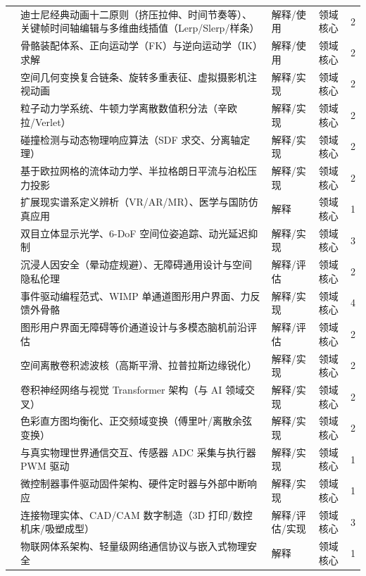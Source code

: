 \begin{tabularx}{\textwidth}{p{} Y p{0.12\textwidth} p{0.10\textwidth} p{0.08\textwidth}}
& 迪士尼经典动画十二原则（挤压拉伸、时间节奏等）、关键帧时间轴编辑与多维曲线插值（Lerp/Slerp/样条） & 解释/使用 & 领域核心 & 2 \\
& 骨骼装配体系、正向运动学（FK）与逆向运动学（IK）求解 & 解释/使用 & 领域核心 & 2 \\
& 空间几何变换复合链条、旋转多重表征、虚拟摄影机注视动画 & 解释/实现 & 领域核心 & 2 \\
\midrule
{} 
& 粒子动力学系统、牛顿力学离散数值积分法（辛欧拉/Verlet） & 解释/实现 & 领域核心 & 2 \\
& 碰撞检测与动态物理响应算法（SDF 求交、分离轴定理） & 解释/实现 & 领域核心 & 2 \\
& 基于欧拉网格的流体动力学、半拉格朗日平流与泊松压力投影 & 解释/实现 & 领域核心 & 2 \\
\midrule
{} 
& 扩展现实谱系定义辨析（VR/AR/MR）、医学与国防仿真应用 & 解释 & 领域核心 & 1 \\
& 双目立体显示光学、6-DoF 空间位姿追踪、动光延迟抑制 & 解释/实现 & 领域核心 & 3 \\
& 沉浸人因安全（晕动症规避）、无障碍通用设计与空间隐私伦理 & 解释/评估 & 领域核心 & 2 \\
\midrule
{} 
& 事件驱动编程范式、WIMP 单通道图形用户界面、力反馈外骨骼 & 解释/实现 & 领域核心 & 4 \\
& 图形用户界面无障碍等价通道设计与多模态脑机前沿评估 & 解释/评估 & 领域核心 & 2 \\
\midrule
{} 
& 空间离散卷积滤波核（高斯平滑、拉普拉斯边缘锐化） & 解释/实现 & 领域核心 & 2 \\
& 卷积神经网络与视觉 Transformer 架构（与 AI 领域交叉） & 解释/实现 & 领域核心 & 2 \\
& 色彩直方图均衡化、正交频域变换（傅里叶/离散余弦变换） & 解释/实现 & 领域核心 & 2 \\
\midrule
{} 
& 与真实物理世界通信交互、传感器 ADC 采集与执行器 PWM 驱动 & 解释/实现 & 领域核心 & 1 \\
& 微控制器事件驱动固件架构、硬件定时器与外部中断响应 & 解释/实现 & 领域核心 & 1 \\
& 连接物理实体、CAD/CAM 数字制造（3D 打印/数控机床/吸塑成型） & 解释/评估/实现 & 领域核心 & 3 \\
& 物联网体系架构、轻量级网络通信协议与嵌入式物理安全 & 解释 & 领域核心 & 1 \\
\bottomrule
\end{tabularx}
\clearpage
\twocolumn